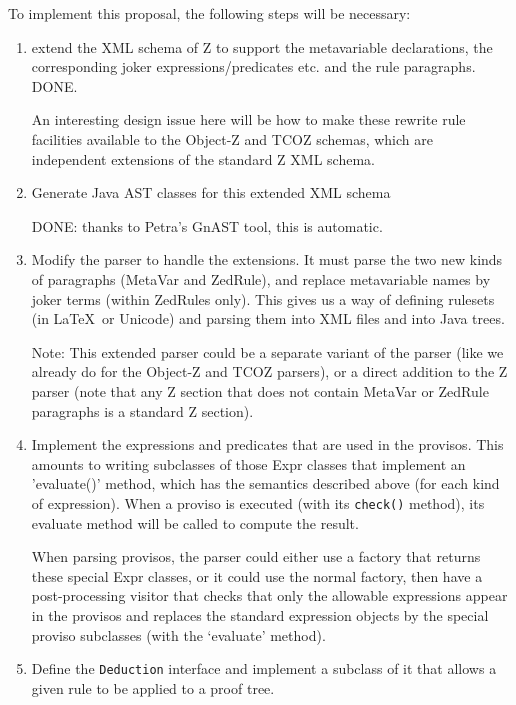 \documentclass{article}
\begin{document}
To implement this proposal, the following steps will be necessary:
\begin{enumerate}
\item extend the XML schema of Z to support the metavariable
  declarations, the corresponding joker expressions/predicates etc.
  and the rule paragraphs.  DONE.

  An interesting design issue here
  will be how to make these rewrite rule facilities available
  to the Object-Z and TCOZ schemas, which are independent extensions
  of the standard Z XML schema.

\item Generate Java AST classes for this extended XML schema
  
  DONE: thanks to Petra's GnAST tool, this is automatic.

\item Modify the parser to handle the extensions.
  It must parse the two new kinds of paragraphs (MetaVar and ZedRule), and
  replace metavariable names by joker terms (within ZedRules only).
  This gives us a way of defining rulesets (in \LaTeX\ or Unicode)
  and parsing them into XML files and into Java trees.

  Note: This extended parser could be a separate variant of the
  parser (like we already do for the Object-Z and TCOZ parsers),
  or a direct addition to the Z parser (note that any Z section 
  that does not contain MetaVar or ZedRule paragraphs is a standard
  Z section).

\item Implement the expressions and predicates that are used
  in the provisos.  This amounts to writing subclasses of
  those Expr classes that implement an 'evaluate()' method,
  which has the semantics described above (for each kind of expression).
  When a proviso is executed (with its \verb!check()! method),
  its evaluate method will be called to compute the result.

  When parsing provisos, the parser could either use a factory that 
  returns these special Expr classes, or it could use the normal factory,
  then have a post-processing visitor that checks that only the allowable
  expressions appear in the provisos and replaces the standard expression
  objects by the special proviso subclasses (with the `evaluate' method).

\item Define the \texttt{Deduction} interface and implement a
  subclass of it that allows a given rule to be applied to
  a proof tree.


\end{enumerate}
\end{document}
